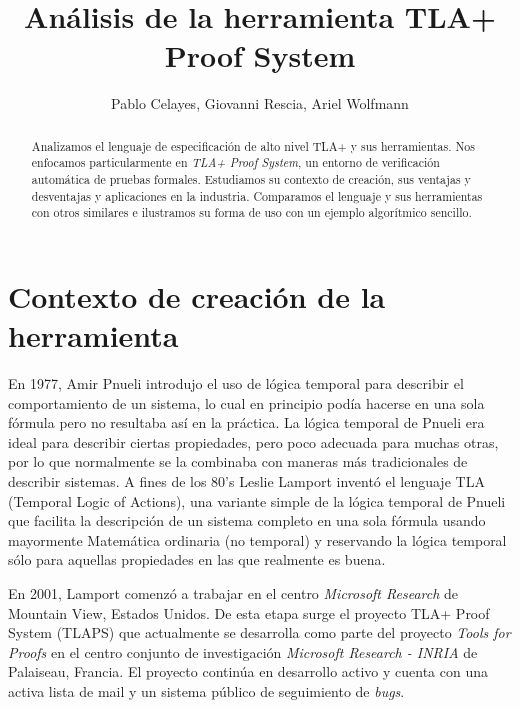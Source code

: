 \documentclass[spanish]{llncs}
\begin{document}
%

\mainmatter              %
%
\title{Análisis de la herramienta TLA+ Proof System}
%
%
\author{Pablo Celayes, Giovanni Rescia, Ariel Wolfmann}

%

\maketitle              %

\begin{abstract}
Analizamos el lenguaje de especificación de alto nivel TLA+ y sus herramientas.
Nos enfocamos particularmente en \textit{TLA+ Proof System}, un entorno de verificación automática de pruebas formales.
Estudiamos su contexto de creación, sus ventajas y desventajas y aplicaciones en la industria.
Comparamos el lenguaje y sus herramientas con otros similares e ilustramos su forma de uso con un ejemplo algorítmico sencillo.
\end{abstract}
%

\section{Contexto de creación de la herramienta}

 En 1977, Amir Pnueli introdujo el uso de lógica temporal para describir el comportamiento de un sistema, lo cual en principio podía hacerse en una sola fórmula pero no resultaba así en la práctica. La lógica temporal de Pnueli era ideal para describir ciertas propiedades, pero poco adecuada para muchas otras, por lo que normalmente se la combinaba con maneras más tradicionales de describir sistemas. \cite{pnueli} A fines de los 80's Leslie Lamport inventó el lenguaje TLA (Temporal Logic of Actions), una variante simple de la lógica temporal de Pnueli que facilita la descripción de un sistema completo en una sola fórmula usando mayormente Matemática ordinaria (no temporal) y reservando la lógica temporal sólo para aquellas propiedades en las que realmente es buena. \cite{specsys}
 
 En 2001, Lamport comenzó a trabajar en el centro \textit{Microsoft Research} de Mountain View, Estados Unidos. De esta etapa surge el proyecto TLA+ Proof System (TLAPS) que actualmente se desarrolla como parte del proyecto \textit{Tools for Proofs} en el centro conjunto de investigación \textit{Microsoft Research - INRIA} de Palaiseau, Francia. 
 El proyecto continúa en desarrollo activo y cuenta con una activa lista de mail y un sistema público de seguimiento de \textit{bugs}.
\end{document}
